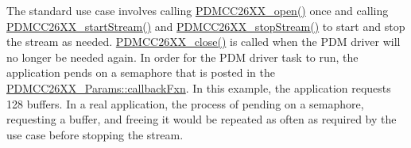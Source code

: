 The standard use case involves calling \hyperlink{_p_d_m_c_c26_x_x_8h_a431d9b71e0d0eebd5ab85960f1c82ee0}{P\+D\+M\+C\+C26\+X\+X\+\_\+open()} once and calling \hyperlink{_p_d_m_c_c26_x_x_8h_af5fafd7c475117bd3ed6783273c2220d}{P\+D\+M\+C\+C26\+X\+X\+\_\+start\+Stream()} and \hyperlink{_p_d_m_c_c26_x_x_8h_aebd3b158f38ba1489a56efe5b9a722d2}{P\+D\+M\+C\+C26\+X\+X\+\_\+stop\+Stream()} to start and stop the stream as needed. \hyperlink{_p_d_m_c_c26_x_x_8h_afb9597d25d6b2e02f6903bf6652d4371}{P\+D\+M\+C\+C26\+X\+X\+\_\+close()} is called when the P\+D\+M driver will no longer be needed again. In order for the P\+D\+M driver task to run, the application pends on a semaphore that is posted in the \hyperlink{struct_p_d_m_c_c26_x_x___params_ada480cae6ca7398efef4293350f92090}{P\+D\+M\+C\+C26\+X\+X\+\_\+\+Params\+::callback\+Fxn}. In this example, the application requests 128 buffers. In a real application, the process of pending on a semaphore, requesting a buffer, and freeing it would be repeated as often as required by the use case before stopping the stream. 

